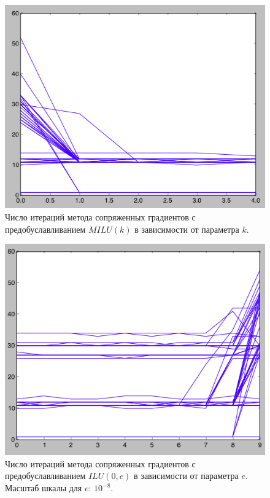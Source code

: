 \begin{figure}[ht]
\includegraphics[width=\textwidth,height=\textheight,keepaspectratio]{milu_k}
\caption{Число итераций метода сопряженных градиентов с предобуславливанием $MILU(k)$ в зависимости от параметра $k$.}
\end{figure}

\begin{figure}[ht]
\includegraphics[width=\textwidth,height=\textheight,keepaspectratio]{ilu_0_e}
\caption{Число итераций метода сопряженных градиентов с предобуславливанием $ILU(0, e)$ в зависимости от параметра $e$. Масштаб шкалы для $e$: $10^{-8}$.}
\end{figure}





